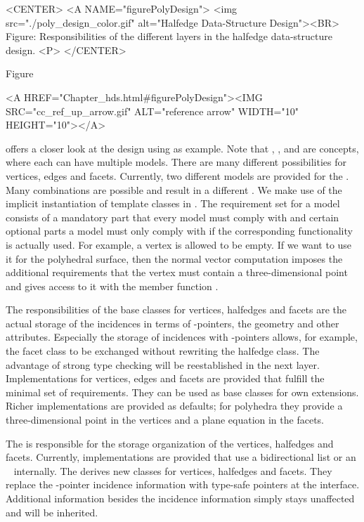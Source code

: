 \begin{ccHtmlOnly}
    <CENTER>
    <A NAME="figurePolyDesign">
        <img src="./poly_design_color.gif"
         alt="Halfedge Data-Structure Design"><BR>
    Figure: Responsibilities of the different layers in the 
            halfedge data-structure design.
    <P>
    </CENTER>
\end{ccHtmlOnly}

Figure~\ccTexHtml{\ref{figurePolyDesign}}{}\begin{ccHtmlOnly}
  <A HREF="Chapter_hds.html#figurePolyDesign"><IMG 
  SRC="cc_ref_up_arrow.gif" ALT="reference arrow" WIDTH="10" HEIGHT="10"></A>
\end{ccHtmlOnly}
offers a closer look at the design using  as example.
Note that , , 
and  are concepts, where each can have multiple
models. There are many different possibilities for vertices, edges and
facets. Currently, two different models are provided for the
. Many combinations are possible and
result in a different .  We make use of the
implicit instantiation of template classes in \CC.  The requirement
set for a model consists of a mandatory part that every model must
comply with and certain optional parts a model must only comply with
if the corresponding functionality is actually used. For example, a
vertex is allowed to be empty. If we want to use it for the polyhedral
surface, then the normal vector computation imposes the additional
requirements that the vertex must contain a three-dimensional point
and gives access to it with the member function .

The responsibilities of the base classes for vertices, halfedges and
facets are the actual storage of the incidences in terms of
-pointers, the geometry and other attributes. Especially the
storage of incidences with -pointers allows, for example,
the facet class to be exchanged without rewriting the halfedge class.
The advantage of strong type checking will be reestablished in the
next layer.  Implementations for vertices, edges and facets are
provided that fulfill the minimal set of requirements. They can be
used as base classes for own extensions.  Richer implementations are
provided as defaults; for polyhedra they provide a three-dimensional
point in the vertices and a plane equation in the facets.

The  is responsible for the storage
organization of the vertices, halfedges and facets. Currently,
implementations are provided that use a bidirectional list or an \stl\ 
 internally. The  derives new
classes for vertices, halfedges and facets. They replace the
-pointer incidence information with type-safe pointers at
the interface. Additional information besides the incidence
information simply stays unaffected and will be inherited.

